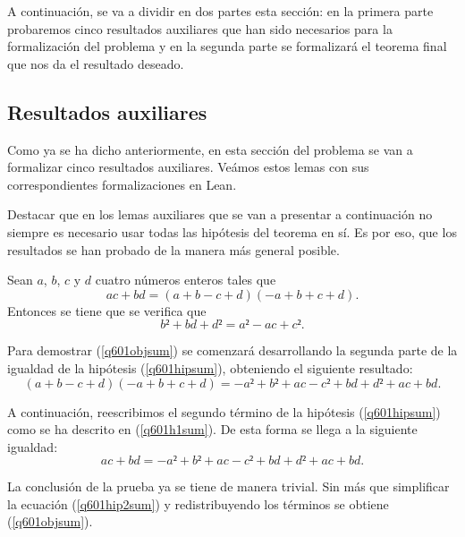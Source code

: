 A continuación, se va a dividir en dos partes esta sección: en la primera
parte probaremos cinco resultados auxiliares que han sido necesarios para
la formalización del problema y en la segunda parte se formalizará el
teorema final que nos da el resultado deseado.

\subsection{Resultados auxiliares}
Como ya se ha dicho anteriormente, en esta sección del problema se van
a formalizar cinco resultados auxiliares. Veámos estos lemas con sus
correspondientes formalizaciones en Lean.

Destacar que en los lemas auxiliares que se van a presentar a continuación
no siempre es necesario usar todas las hipótesis del teorema en sí. Es por eso,
que los resultados se han probado de la manera más general posible.

\begin{lema}\label{q601lemasuma}
  Sean \(a\), \(b\), \(c\) y \(d\) cuatro números enteros tales que 
    \begin{equation}\label{q601hipsum}\tag{h}
      ac+bd = (a+b-c+d)(-a+b+c+d).
    \end{equation}
    Entonces se tiene que se verifica que
    \begin{equation}\label{q601objsum}
      b²+bd+d²=a²-ac+c².
    \end{equation}
\end{lema}

\begin{demostracion}
  Para demostrar (\ref{q601objsum}) se comenzará desarrollando la segunda
  parte de la igualdad de la hipótesis (\ref{q601hipsum}), obteniendo el
  siguiente resultado:
  \begin{equation}\tag{h1}\label{q601h1sum}
    (a+b-c+d)(-a+b+c+d)=-a²+b²+ac-c²+bd+d²+ac+bd.
  \end{equation}

  A continuación, reescribimos el segundo término de la hipótesis
  (\ref{q601hipsum}) como se ha descrito en (\ref{q601h1sum}). De esta
  forma se llega a la siguiente igualdad:
  \begin{equation}\label{q601hip2sum}
    ac+bd=-a²+b²+ac-c²+bd+d²+ac+bd.
  \end{equation}

  La conclusión de la prueba ya se tiene de manera trivial. Sin más que
  simplificar la ecuación (\ref{q601hip2sum}) y redistribuyendo los términos
  se obtiene (\ref{q601objsum}).
\end{demostracion}

